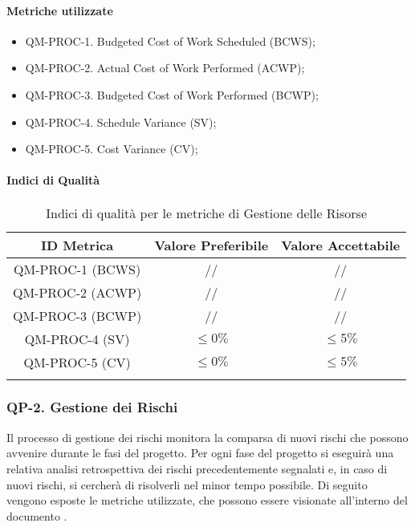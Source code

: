 		\paragraph{Metriche utilizzate}

			\begin{itemize}
				\item QM-PROC-1. Budgeted Cost of Work Scheduled (BCWS);
				\item QM-PROC-2. Actual Cost of Work Performed (ACWP);
				\item QM-PROC-3. Budgeted Cost of Work Performed (BCWP);
				\item QM-PROC-4. Schedule Variance (SV);
				\item QM-PROC-5. Cost Variance (CV);
			\end{itemize}

		\paragraph{Indici di Qualità}

			\begin{center}
				\begin{longtable}{|c|c|c|}
				\hline
				\rowcolor{lighter-grayer}
				\textbf{ID Metrica} & \textbf{Valore Preferibile} & \textbf{Valore Accettabile}\\
				\hline
				\endfirsthead
				\hline
				QM-PROC-1 (BCWS) & // & // \\
				\hline
				QM-PROC-2 (ACWP) & // & // \\
				\hline
				QM-PROC-3 (BCWP) & // & // \\
				\hline
				QM-PROC-4 (SV) & \(\le 0\%\) & \(\le 5\%\) \\
				\hline
				QM-PROC-5 (CV) & \(\le 0\%\) & \(\le 5\%\) \\
				\hline
				\caption{Indici di qualità per le metriche di Gestione delle Risorse}
				\end{longtable}
			\end{center}

	\subsubsection{QP-2. Gestione dei Rischi}

		Il processo di gestione dei rischi monitora la comparsa di nuovi rischi che possono avvenire durante le fasi del progetto.
		Per ogni fase del progetto si eseguirà una relativa analisi retrospettiva dei rischi precedentemente segnalati e, in caso di nuovi rischi, si cercherà di risolverli nel minor tempo possibile.
		Di seguito vengono esposte le metriche utilizzate, che possono essere visionate all'interno del documento .

